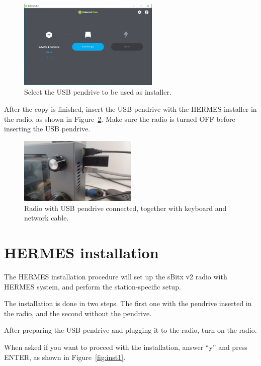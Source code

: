 \documentclass[11pt,a4paper]{article}
\begin{document}
\begin{figure}[H]
  \centering
  \includegraphics[width=0.6\textwidth]{pictures/balena-4-ed.jpg}
  \caption{Select the USB pendrive to be used as installer.}
  \label{fig:balena4}
\end{figure}

After the copy is finished, insert the USB pendrive with the HERMES installer in the radio, as shown in Figure~\ref{fig:pen1}.
Make sure the radio is turned OFF before inserting the USB pendrive.


\begin{figure}[H]
  \centering
  \includegraphics[width=0.5\textwidth]{pictures/usb-1.jpeg}
  \caption{Radio with USB pendrive connected, together with keyboard and network cable.}
  \label{fig:pen1}
\end{figure}


\section{HERMES installation}

The HERMES installation procedure will set up the sBitx v2 radio with HERMES system,
and perform the station-specific setup.

The installation is done in two steps. The first one with the
pendrive inserted in the radio, and the second without the pendrive.

After preparing the USB pendrive and plugging it to the radio, turn on the radio.

When asked if you want to proceed with the installation, answer ``y'' and press ENTER, as shown in Figure~\ref{fig:inst1}.
\end{document}

